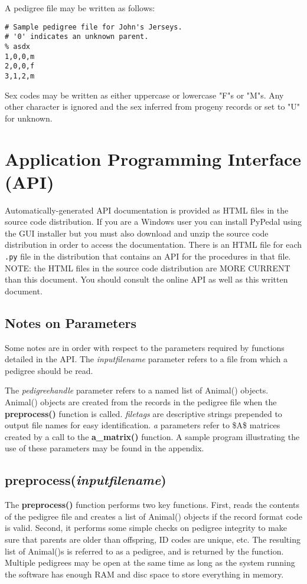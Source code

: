 A pedigree file may be written as follows:

\begin{verbatim}
# Sample pedigree file for John's Jerseys.
# '0' indicates an unknown parent.
% asdx
1,0,0,m
2,0,0,f
3,1,2,m
\end{verbatim}

Sex codes may be written as either uppercase or lowercase "F"s or "M"s.  Any other character is ignored and the sex inferred from progeny records or set to "U" for unknown.

\section{Application Programming Interface (API)}
Automatically-generated API documentation is provided as HTML files in the source code distribution.  If you are a Windows user you can install Py{P}edal using the GUI installer but you must also download and unzip the source code distribution in order to access the documentation.  There is an HTML file for each \texttt{.py} file in the distribution that contains an API for the procedures in that file.  NOTE: the HTML files in the source code distribution are MORE CURRENT than this document.  You should consult the online API as well as this written document.

\subsection{Notes on Parameters}
Some notes are in order with respect to the parameters required by functions detailed in the API.  The \textit{inputfilename} parameter refers to a file from which a pedigree should be read.

The \textit{pedigreehandle} parameter refers to a named list of Animal() objects.  Animal() objects are created from the records in the pedigree file when the \textbf{preprocess()} function is called.  \textit{filetags} are descriptive strings prepended to output file names for easy identification.  \textit{a} parameters refer to \$A\$ matrices created by a call to the \textbf{a\_matrix()}  function.  A sample program illustrating the use of these parameters may be found in the appendix.

\subsection{preprocess(\textit{inputfilename})}
The \textbf{preprocess()} function performs two key functions.  First, reads the contents of the pedigree file and creates a list of Animal() objects if the record format code is valid.  Second, it performs some simple checks on pedigree integrity to make sure that parents are older than offspring, ID codes are unique, etc.  The resulting list of Animal()s is referred to as a pedigree, and is returned by the function.  Multiple pedigrees may be open at the same time as long as the system running the software has enough RAM and disc space to store everything in memory.

